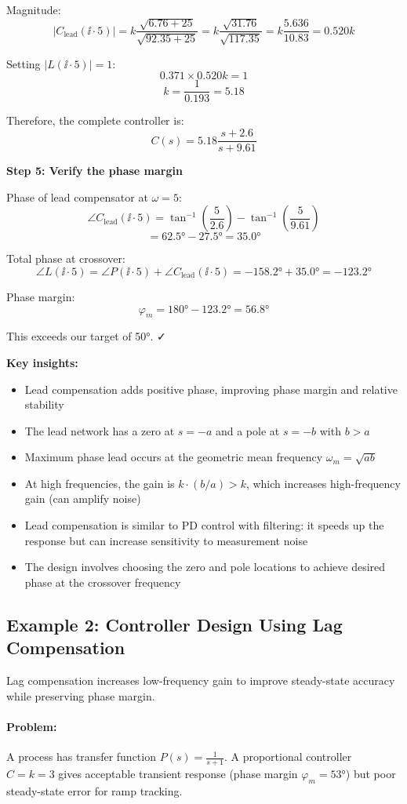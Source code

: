 \documentclass[11pt,a4paper]{article}
\begin{document}
Magnitude:
\[
|C_{\text{lead}}(\ii \cdot 5)| = k\frac{\sqrt{6.76 + 25}}{\sqrt{92.35 + 25}} = k\frac{\sqrt{31.76}}{\sqrt{117.35}} = k\frac{5.636}{10.83} = 0.520k
\]

Setting $|L(\ii \cdot 5)| = 1$:
\[
0.371 \times 0.520k = 1
\]
\[
k = \frac{1}{0.193} = 5.18
\]

Therefore, the complete controller is:
\[
C(s) = 5.18\frac{s + 2.6}{s + 9.61}
\]

\textbf{Step 5: Verify the phase margin}

Phase of lead compensator at $\omega = 5$:
\[
\angle C_{\text{lead}}(\ii \cdot 5) = \tan^{-1}\left(\frac{5}{2.6}\right) - \tan^{-1}\left(\frac{5}{9.61}\right)
\]
\[
= 62.5° - 27.5° = 35.0°
\]

Total phase at crossover:
\[
\angle L(\ii \cdot 5) = \angle P(\ii \cdot 5) + \angle C_{\text{lead}}(\ii \cdot 5) = -158.2° + 35.0° = -123.2°
\]

Phase margin:
\[
\varphi_m = 180° - 123.2° = 56.8°
\]

This exceeds our target of 50°. ✓

\textbf{Key insights:}
\begin{itemize}
\item Lead compensation adds positive phase, improving phase margin and relative stability
\item The lead network has a zero at $s = -a$ and a pole at $s = -b$ with $b > a$
\item Maximum phase lead occurs at the geometric mean frequency $\omega_m = \sqrt{ab}$
\item At high frequencies, the gain is $k \cdot (b/a) > k$, which increases high-frequency gain (can amplify noise)
\item Lead compensation is similar to PD control with filtering: it speeds up the response but can increase sensitivity to measurement noise
\item The design involves choosing the zero and pole locations to achieve desired phase at the crossover frequency
\end{itemize}

\subsection{Example 2: Controller Design Using Lag Compensation}

Lag compensation increases low-frequency gain to improve steady-state accuracy while preserving phase margin.

\paragraph{Problem:}
A process has transfer function $P(s) = \frac{1}{s+1}$. A proportional controller $C = k = 3$ gives acceptable transient response (phase margin $\varphi_m = 53°$) but poor steady-state error for ramp tracking.
\end{document}
